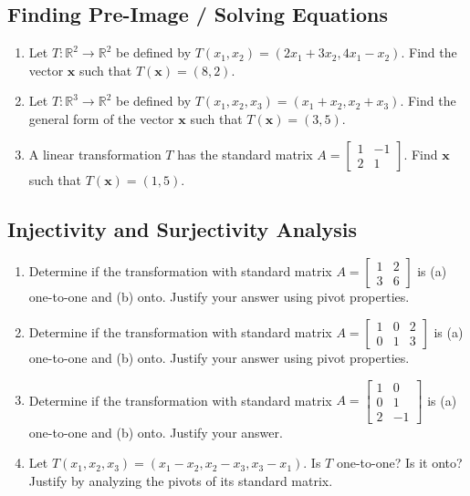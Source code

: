 \documentclass[12pt]{article}
\begin{document}
\subsection*{Finding Pre-Image / Solving Equations}
\begin{enumerate}[resume]
    \item Let $T: \mathbb{R}^2 \rightarrow \mathbb{R}^2$ be defined by $T(x_1, x_2) = (2x_1 + 3x_2, 4x_1 - x_2)$. Find the vector $\mathbf{x}$ such that $T(\mathbf{x}) = (8, 2)$.
    
    \item Let $T: \mathbb{R}^3 \rightarrow \mathbb{R}^2$ be defined by $T(x_1, x_2, x_3) = (x_1 + x_2, x_2 + x_3)$. Find the general form of the vector $\mathbf{x}$ such that $T(\mathbf{x}) = (3, 5)$.
    
    \item A linear transformation $T$ has the standard matrix $A = \begin{bmatrix} 1 & -1 \\ 2 & 1 \end{bmatrix}$. Find $\mathbf{x}$ such that $T(\mathbf{x}) = (1, 5)$.
\end{enumerate}

\subsection*{Injectivity and Surjectivity Analysis}
\begin{enumerate}[resume]
    \item Determine if the transformation with standard matrix $A = \begin{bmatrix} 1 & 2 \\ 3 & 6 \end{bmatrix}$ is (a) one-to-one and (b) onto. Justify your answer using pivot properties.
    
    \item Determine if the transformation with standard matrix $A = \begin{bmatrix} 1 & 0 & 2 \\ 0 & 1 & 3 \end{bmatrix}$ is (a) one-to-one and (b) onto. Justify your answer using pivot properties.
    
    \item Determine if the transformation with standard matrix $A = \begin{bmatrix} 1 & 0 \\ 0 & 1 \\ 2 & -1 \end{bmatrix}$ is (a) one-to-one and (b) onto. Justify your answer.
    
    \item Let $T(x_1, x_2, x_3) = (x_1 - x_2, x_2 - x_3, x_3 - x_1)$. Is $T$ one-to-one? Is it onto? Justify by analyzing the pivots of its standard matrix.
\end{enumerate}
\end{document}
